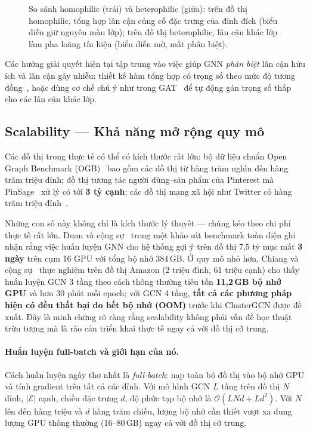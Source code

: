 \begin{figure}[htbp]
\begin{tikzpicture}
\end{tikzpicture}
\caption{So sánh homophilic (trái) và heterophilic (giữa): trên đồ thị homophilic, tổng hợp lân cận củng cố đặc trưng của đỉnh đích (biểu diễn giữ nguyên màu lớp); trên đồ thị heterophilic, lân cận khác lớp làm pha loãng tín hiệu (biểu diễn mờ, mất phân biệt).}
\label{fig:heterophily}
\end{figure}

Các hướng giải quyết hiện tại tập trung vào việc giúp GNN \textit{phân biệt} lân cận hữu ích và lân cận gây nhiễu: thiết kế hàm tổng hợp có trọng số theo mức độ tương đồng~\cite{Zheng2022SurveyHeterophily}, hoặc dùng cơ chế chú ý như trong GAT~\cite{Velickovic2018} để tự động gán trọng số thấp cho các lân cận khác lớp.

\subsection{Scalability --- Khả năng mở rộng quy mô}

Các đồ thị trong thực tế có thể có kích thước rất lớn: bộ dữ liệu chuẩn Open Graph Benchmark (OGB)~\cite{Hu2020OGB} bao gồm các đồ thị từ hàng trăm nghìn đến hàng trăm triệu đỉnh; đồ thị tương tác người dùng--sản phẩm của Pinterest mà PinSage~\cite{Ying2018PinSage} xử lý có tới \textbf{3 tỷ cạnh}; các đồ thị mạng xã hội như Twitter có hàng trăm triệu đỉnh~\cite{Hamilton2017}.

Những con số này không chỉ là kích thước lý thuyết --- chúng kéo theo chi phí thực tế rất lớn. Duan và cộng sự~\cite{Duan2022LargeScaleBenchmark} trong một khảo sát benchmark toàn diện ghi nhận rằng việc huấn luyện GNN cho hệ thống gợi ý trên đồ thị 7,5 tỷ mục mất \textbf{3 ngày} trên cụm 16 GPU với tổng bộ nhớ 384\,GB. Ở quy mô nhỏ hơn, Chiang và cộng sự~\cite{Chiang2019ClusterGCN} thực nghiệm trên đồ thị Amazon (2 triệu đỉnh, 61 triệu cạnh) cho thấy huấn luyện GCN 3 tầng theo cách thông thường tiêu tốn \textbf{11,2\,GB bộ nhớ GPU} và hơn 30 phút mỗi epoch; với GCN 4 tầng, \textbf{tất cả các phương pháp hiện có đều thất bại do hết bộ nhớ (OOM)} trước khi ClusterGCN được đề xuất. Đây là minh chứng rõ ràng rằng scalability không phải vấn đề học thuật trừu tượng mà là rào cản triển khai thực tế ngay cả với đồ thị cỡ trung.

\paragraph{Huấn luyện full-batch và giới hạn của nó.}
Cách huấn luyện ngây thơ nhất là \textit{full-batch}: nạp toàn bộ đồ thị vào bộ nhớ GPU và tính gradient trên tất cả các đỉnh. Với mô hình GCN $L$ tầng trên đồ thị $N$ đỉnh, $|\mathcal{E}|$ cạnh, chiều đặc trưng $d$, độ phức tạp bộ nhớ là $\mathcal{O}(LNd + Ld^{2})$. Với $N$ lên đến hàng triệu và $d$ hàng trăm chiều, lượng bộ nhớ cần thiết vượt xa dung lượng GPU thông thường (16--80\,GB) ngay cả với đồ thị cỡ trung.

